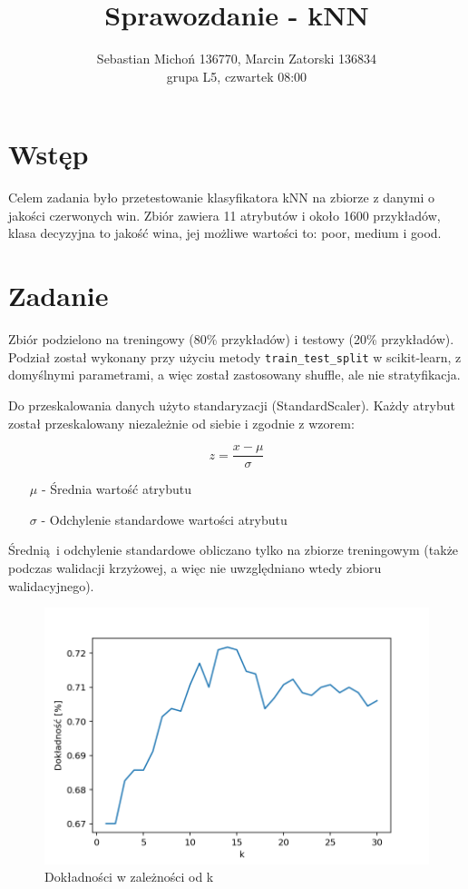 \documentclass[12pt]{article}
\title{\vspace{-1.5in}Sprawozdanie - kNN}
\author{Sebastian Michoń 136770, Marcin Zatorski 136834\\ grupa L5, czwartek 08:00}
\date{}
\begin{document}
\maketitle

\section{Wstęp}
Celem zadania było przetestowanie klasyfikatora kNN na zbiorze z danymi o jakości czerwonych win. Zbiór zawiera 11 atrybutów i około 1600 przykładów, klasa decyzyjna to jakość wina, jej możliwe wartości to: poor, medium i good.

\section{Zadanie}

Zbiór podzielono na treningowy (80\% przykładów) i testowy (20\% przykładów). Podział został wykonany przy użyciu metody \texttt{train\_test\_split} w scikit-learn, z domyślnymi parametrami, a więc został zastosowany shuffle, ale nie stratyfikacja.

Do przeskalowania danych użyto standaryzacji (StandardScaler). Każdy atrybut został przeskalowany niezależnie od siebie i zgodnie z wzorem:

\begin{equation}
z = \frac{x - \mu}{\sigma}
\end{equation}
\begin{enumerate}
	\item[$\mu$] - Średnia wartość atrybutu
	\item[$\sigma$] - Odchylenie standardowe wartości atrybutu
\end{enumerate}
Średnią i odchylenie standardowe obliczano tylko na zbiorze treningowym (także podczas walidacji krzyżowej, a więc nie uwzględniano wtedy zbioru walidacyjnego).

\begin{figure}[htb!]
	\centering
	\includegraphics[width=0.7\columnwidth]{accuracy_knn.png}
	\caption{Dokładności w zależności od k}
	\label{fig:accuracy}
\end{figure}
\end{document}
